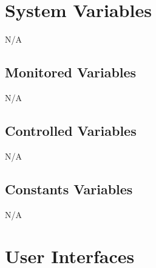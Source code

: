 \documentclass[12pt, titlepage]{article}
\begin{document}
\section{System Variables}

N/A

\subsection{Monitored Variables}
N/A
\subsection{Controlled Variables}
N/A
\subsection{Constants Variables}
N/A
\section{User Interfaces}
\end{document}
